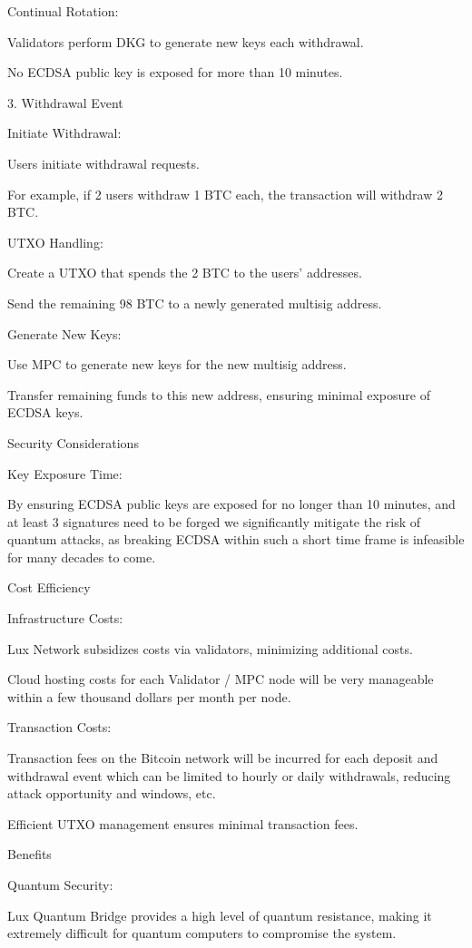 \documentclass[11pt]{article}
\begin{document}
Continual Rotation:


Validators perform DKG to generate new keys each withdrawal.


No ECDSA public key is exposed for more than 10 minutes.


3.⁠ ⁠Withdrawal Event


Initiate Withdrawal:


Users initiate withdrawal requests.


For example, if 2 users withdraw 1 BTC each, the transaction will withdraw 2 BTC.


UTXO Handling:


Create a UTXO that spends the 2 BTC to the users' addresses.


Send the remaining 98 BTC to a newly generated multisig address.


Generate New Keys:


Use MPC to generate new keys for the new multisig address.


Transfer remaining funds to this new address, ensuring minimal exposure of ECDSA keys.


Security Considerations


Key Exposure Time:


By ensuring ECDSA public keys are exposed for no longer than 10 minutes, and at least 3 signatures need to be forged we significantly mitigate the risk of quantum attacks, as breaking ECDSA within such a short time frame is infeasible for many decades to come.


Cost Efficiency


Infrastructure Costs:


Lux Network subsidizes costs via validators, minimizing additional costs.


Cloud hosting costs for each Validator / MPC node will be very manageable within a few thousand dollars per month per node.


Transaction Costs:


Transaction fees on the Bitcoin network will be incurred for each deposit and withdrawal event which can be limited to hourly or daily withdrawals, reducing attack opportunity and windows, etc.


Efficient UTXO management ensures minimal transaction fees.


Benefits


Quantum Security:


Lux Quantum Bridge provides a high level of quantum resistance, making it extremely difficult for quantum computers to compromise the system.
\end{document}
